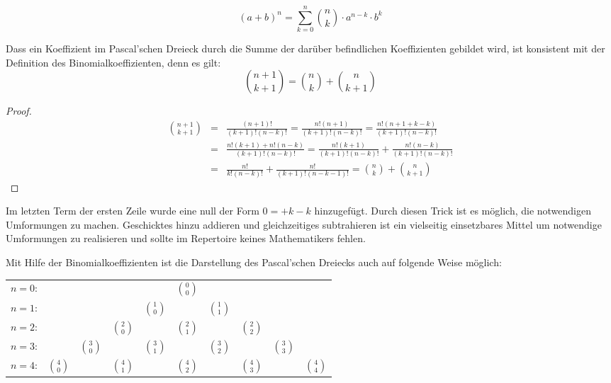 \begin{equation}
(a+b)^n = \sum_{k=0}^{n} \binom{n}{k} \cdot a^{n-k}\cdot b^k
\end{equation}

\begin{claim}
Dass ein Koeffizient im Pascal'schen Dreieck durch die Summe der darüber befindlichen Koeffizienten gebildet wird, ist konsistent mit der Definition des Binomialkoeffizienten, denn es gilt:
\[
\binom{n+1}{k+1} = \binom{n}{k} + \binom{n}{k+1}
\]
\end{claim}

\begin{proof}
\begin{eqnarray*}
\binom{n+1}{k+1} &=& \frac{(n+1)!}{(k+1)!(n-k)!} = \frac{n!(n+1)}{(k+1)!(n-k)!} = \frac{n!(n+1+k-k)}{(k+1)!(n-k)!} \\
&=& \frac{n!(k+1) +n!(n-k)}{(k+1)!(n-k)!} = \frac{n!(k+1)}{(k+1)!(n-k)!}+\frac{n!(n-k)}{(k+1)!(n-k)!} \\
&=& \frac{n!}{k!(n-k)!} + \frac{n!}{(k+1)!(n-k-1)!} = \binom{n}{k}+\binom{n}{k+1}
\end{eqnarray*}
\end{proof}

\HandRight \qquad Im letzten Term der ersten Zeile wurde eine null der Form $0=+k-k$ hinzugefügt. Durch diesen Trick ist es möglich, die notwendigen Umformungen zu machen. Geschicktes hinzu addieren und gleichzeitiges subtrahieren ist ein vielseitig einsetzbares Mittel um notwendige Umformungen zu realisieren und sollte im Repertoire keines Mathematikers fehlen. 

\bigskip

Mit Hilfe der Binomialkoeffizienten ist die Darstellung des Pascal'schen Dreiecks auch auf folgende Weise möglich:

\begin{center}
\begin{tabular}{rccccccccc} 
$n=0$:& & & & & $\binom{0}{0}$\\
\noalign{\smallskip} $n=1$:& & & & $\binom{1}{0}$ & & $\binom{1}{1}$\\
\noalign{\smallskip} $n=2$:& & & $\binom{2}{0}$ & & $\binom{2}{1}$ & & $\binom{2}{2}$\\
\noalign{\smallskip} $n=3$:& & $\binom{3}{0}$ & & $\binom{3}{1}$ & & $\binom{3}{2}$ & & $\binom{3}{3}$\\
\noalign{\smallskip} $n=4$:& $\binom{4}{0}$ & & $\binom{4}{1}$ & & $\binom{4}{2}$ & & $\binom{4}{3}$ & & $\binom{4}{4}$
\end{tabular}
\end{center}


